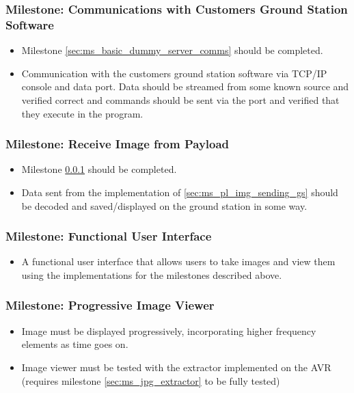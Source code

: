 	\subsubsection{Milestone: Communications with Customers Ground Station Software}
		\label{sec:ms_gs_basestation_comms}
		\begin{itemize}
			\item 	Milestone \ref{sec:ms_basic_dummy_server_comms} should be
				completed.
			\item 	Communication with the customers ground station software via TCP/IP console and
				data port. Data should be streamed from some known source and verified correct and
				commands should be sent via the port and verified that they execute in the program.
		\end{itemize}

	\subsubsection{Milestone: Receive Image from Payload}
		\label{sec:ms_gs_recieve_image}
		\begin{itemize}
			\item 	Milestone \ref{sec:ms_gs_basestation_comms} should be completed.
			\item 	Data sent from the implementation of \ref{sec:ms_pl_img_sending_gs} should be
				decoded and saved/displayed on the ground station in some way.
		\end{itemize}

	\subsubsection{Milestone: Functional User Interface}
		\label{sec:ms_gs_func_interface}
		\begin{itemize}
			\item 	A functional user interface that allows users to take images and view them using the implementations
				for the milestones described above.
		\end{itemize}

	\subsubsection{Milestone: Progressive Image Viewer}
		\label{sec:ms_prog_img_viewer}
		\begin{itemize}
			\item  Image must be displayed progressively, incorporating higher
				frequency elements as time goes on.
			\item 	Image viewer must be tested with the extractor
				implemented on the AVR (requires
				milestone \ref{sec:ms_jpg_extractor} to be fully tested)
		\end{itemize}

